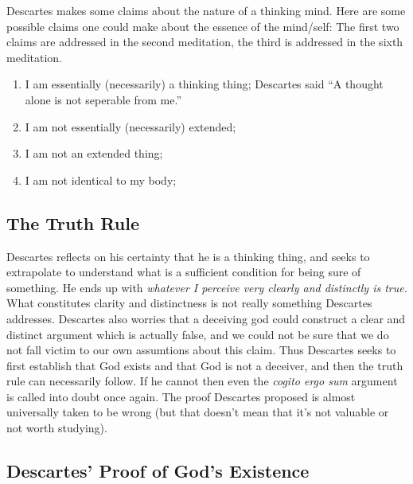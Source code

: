 Descartes makes some claims about the nature of a thinking mind. Here are some possible claims one could make about the essence of the mind/self: The first two claims are addressed in the second meditation, the third is addressed in the sixth meditation.
\begin{enumerate}
\item I am essentially (necessarily) a thinking thing; Descartes said ``A thought alone is not seperable from me.''
\item I am not essentially (necessarily) extended;
\item I am not an extended thing; 
\item I am not identical to my body;
\end{enumerate}

\subsection*{The Truth Rule}

Descartes reflects on his certainty that he is a thinking thing, and seeks to extrapolate to understand what is a sufficient condition for being sure of something. He ends up with \emph{whatever I perceive very clearly and distinctly is true.} What constitutes clarity and distinctness is not really something Descartes addresses. Descartes also worries that a deceiving god could construct a clear and distinct argument which is actually false, and we could not be sure that we do not fall victim to our own assumtions about this claim. Thus Descartes seeks to first establish that God exists and that God is not a deceiver, and then the truth rule can necessarily follow. If he cannot then even the \emph{cogito ergo sum} argument is called into doubt once again. The proof Descartes proposed is almost universally taken to be wrong (but that doesn't mean that it's not valuable or not worth studying).

\subsection*{Descartes' Proof of God's Existence}

